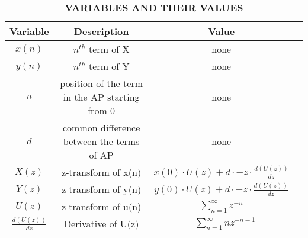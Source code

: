 \documentclass{article}
\begin{document}
\begin{table}
    \centering
    \begin{tabular}{|c|c|c|c|}
    \hline
       \textbf{Variable}& \textbf{Description}& \textbf{Value}\\\hline
         $x(n)$& $n^{th}$ term of X&none\\\hline
          $y(n)$& $n^{th}$ term of Y&none\\\hline
         $n$&   position of the term in the AP starting from 0&none\\\hline
          $d$&common difference between the terms of AP&none\\\hline
          $X(z)$& z-transform of x(n)&$x(0)\cdot U(z) + d\cdot{-z} \cdot \frac {d(U(z))}{dz}$ \\\hline
         $Y(z)$& z-transform of y(n)&$y(0)\cdot U(z) + d\cdot{-z} \cdot \frac {d(U(z))}{dz}$\\\hline
          $U(z)$& z-transform of u(n)& $\sum_{ n=1}^{\infty} z^{-n}$\\\hline
         $\frac{d(U(z))}{dz}$& Derivative of U(z)&$-\sum_{n=1}^{\infty}nz^{-n-1}$\\\hline
         
    \end{tabular}
    \caption{\textbf{VARIABLES AND THEIR VALUES}}
    \label{tab:my_label}
\end{table}
\end{document}
